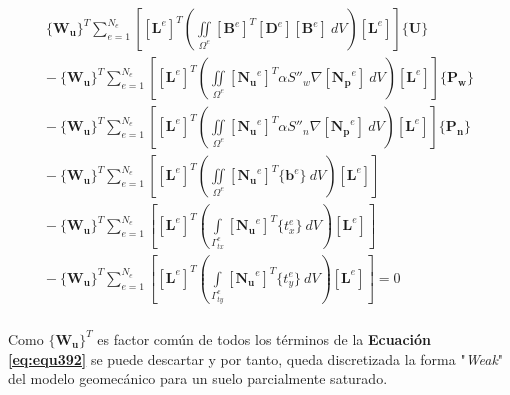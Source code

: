 \begin{ceqn} 
\begin{gather}\label{eq:equ392}
\begin{multlined}
 \{\mathbf{W_u}\}^T  \displaystyle\sum_{e=1}^{N_e} \left[ \left[\mathbf{L}^e\right]^T \left( \iint \limits_{\Omega^e}  [\mathbf{B}^e]^T [\mathbf{D}^e] [\mathbf{B}^e]\ dV \right) \left[\mathbf{L}^e\right] \right] \{\mathbf{U}\}\\[10pt]
-\ \{\mathbf{W_u}\}^T \displaystyle\sum_{e=1}^{N_e} \left[ \left[\mathbf{L}^e\right]^T \left( \iint \limits_{\Omega^e}  [\mathbf{N_u}^e]^T \alpha S''_w \nabla [\mathbf{N_p}^e]\ dV \right) \left[\mathbf{L}^e\right] \right] \{\mathbf{P_w}\} \\[10pt]
-\ \{\mathbf{W_u}\}^T \displaystyle\sum_{e=1}^{N_e} \left[ \left[\mathbf{L}^e\right]^T \left( \iint \limits_{\Omega^e}  [\mathbf{N_u}^e]^T \alpha S''_n \nabla [\mathbf{N_p}^e]\ dV \right) \left[\mathbf{L}^e\right] \right] \{\mathbf{P_n}\} \\[10pt]
-\ \{\mathbf{W_u}\}^T \displaystyle\sum_{e=1}^{N_e} \left[ \left[\mathbf{L}^e\right]^T \left( \iint \limits_{\Omega^e}  [\mathbf{N_u}^e]^T  \{\mathbf{b}^e\}\ dV \right) \left[\mathbf{L}^e\right] \right] \\[10pt]
-\ \{\mathbf{W_u}\}^T \displaystyle\sum_{e=1}^{N_e} \left[ \left[\mathbf{L}^e\right]^T \left( \int \limits_{\Gamma^e_{tx}} [\mathbf{N_u}^e]^T  \{t^e_x\}\ dV \right) \left[\mathbf{L}^e\right] \right] \\[10pt]
-\ \{\mathbf{W_u}\}^T \displaystyle\sum_{e=1}^{N_e} \left[ \left[\mathbf{L}^e\right]^T \left( \int \limits_{\Gamma^e_{ty}} [\mathbf{N_u}^e]^T  \{t^e_y\}\ dV \right) \left[\mathbf{L}^e\right] \right]  = 0 \\[10pt]
\end{multlined}
\end{gather}  
\end{ceqn}

Como $\{\mathbf{W_u}\}^T$ es factor común de todos los términos de la \textbf{Ecuación} \textbf{\ref{eq:equ392}} se puede descartar y por tanto, queda discretizada la forma "\textit{Weak}" del modelo geomecánico para un suelo parcialmente saturado.
\newpage


